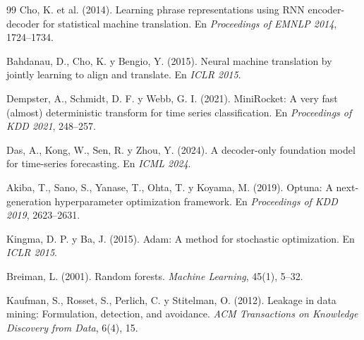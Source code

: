 \begin{thebibliography}{99}
 Cho, K. et al. (2014). Learning phrase representations using RNN encoder-decoder for statistical machine
  translation. En \textit{Proceedings of EMNLP 2014}, 1724--1734.

 Bahdanau, D., Cho, K. y Bengio, Y. (2015). Neural machine translation by jointly learning to align
  and translate. En \textit{ICLR 2015}.

 Dempster, A., Schmidt, D. F. y Webb, G. I. (2021). MiniRocket: A very fast (almost) deterministic
  transform for time series classification. En \textit{Proceedings of KDD 2021}, 248--257.

 Das, A., Kong, W., Sen, R. y Zhou, Y. (2024). A decoder-only foundation model for time-series
  forecasting. En \textit{ICML 2024}.

 Akiba, T., Sano, S., Yanase, T., Ohta, T. y Koyama, M. (2019). Optuna: A next-generation
  hyperparameter optimization framework. En \textit{Proceedings of KDD 2019}, 2623--2631.

 Kingma, D. P. y Ba, J. (2015). Adam: A method for stochastic optimization. En \textit{ICLR 2015}.

 Breiman, L. (2001). Random forests. \textit{Machine Learning}, 45(1), 5--32.

 Kaufman, S., Rosset, S., Perlich, C. y Stitelman, O. (2012). Leakage in data mining: Formulation,
  detection, and avoidance. \textit{ACM Transactions on Knowledge Discovery from Data}, 6(4), 15.

\end{thebibliography}
